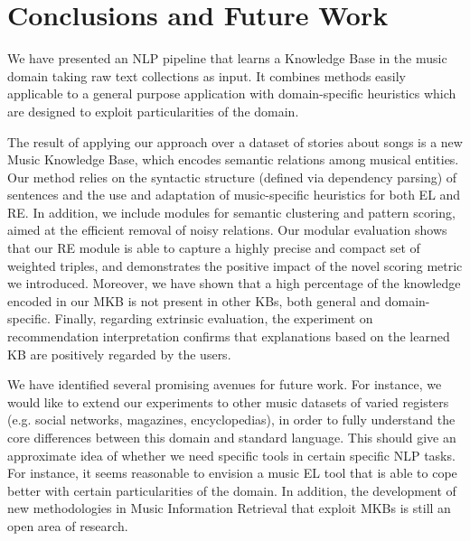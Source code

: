 \section{Conclusions and Future Work}\label{sec:conclusions}

We have presented an NLP pipeline that learns a Knowledge Base in the music domain taking raw text collections as input. It combines methods easily applicable to a general purpose application with domain-specific heuristics which are designed to exploit particularities of the domain.

The result of applying our approach over a dataset of stories about songs is a new Music Knowledge Base, which encodes semantic relations among musical entities. Our method relies on the syntactic structure (defined via dependency parsing) of sentences and the use and adaptation of music-specific heuristics for both \textsc{EL} and \textsc{RE}. In addition, we include modules for semantic clustering and pattern scoring, aimed at the efficient removal of noisy relations. Our modular evaluation shows that our \textsc{RE} module is able to capture a highly precise and compact set of weighted triples, and demonstrates the positive impact of the novel scoring metric we introduced. Moreover, we have shown that a high percentage of the knowledge encoded in our \textsc{MKB} is not present in other \textsc{KB}s, both general and domain-specific. Finally, regarding extrinsic evaluation, the experiment on recommendation interpretation confirms that explanations based on the learned \textsc{KB} are positively regarded by the users.

We have identified several promising avenues for future work. For instance, we would like to extend our experiments to other music datasets of varied registers (e.g. social networks, magazines, encyclopedias), in order to fully understand the core differences between this domain and standard language. This should give an approximate idea of whether we need specific tools in certain specific NLP tasks. For instance, it seems reasonable to envision a music \textsc{EL} tool that is able to cope better with certain particularities of the domain.
In addition, the development of new methodologies in Music Information Retrieval that exploit \textsc{MKB}s is still an open area of research.
